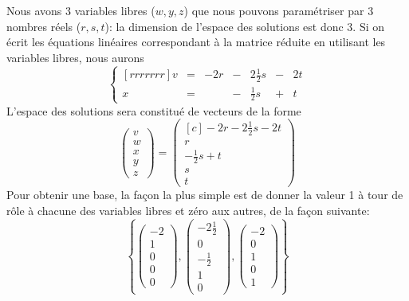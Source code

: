 \begin{exemple}
\[\]
Nous avons 3 variables libres ($w, y, z$) que nous pouvons paramétriser par 3 nombres
réels ($r,s,t$): la dimension de l'espace des solutions est donc 3.  Si on écrit
les équations linéaires correspondant à la matrice réduite en utilisant les variables
libres, nous aurons
\[
\left\{
\begin{matrix}[rrrrrrr]
v &=& -2r &-& 2\frac12 s &-& 2t \\
x &=& &-& \frac12 s &+& t
\end{matrix}
\right.
\]
L'espace des solutions sera constitué de vecteurs de la forme
\[
\begin{pmatrix}
v \\ w \\ x \\ y \\ z
\end{pmatrix}
=
\begin{pmatrix}[c]
-2r-2\frac12 s -2t \\ r \\ -\frac12s + t \\ s \\ t
\end{pmatrix}
\]
Pour obtenir une base, la façon la plus simple est de donner la valeur 1 à tour de rôle à chacune des variables 
libres et zéro aux autres, de la façon suivante:
\[
\left\{
\begin{pmatrix}
-2 \\ 1 \\ 0 \\ 0 \\ 0
\end{pmatrix},
\begin{pmatrix}
-2\frac12 \\ 0 \\ -\frac12 \\ 1 \\ 0
\end{pmatrix},
\begin{pmatrix}
-2 \\ 0 \\ 1 \\ 0 \\ 1
\end{pmatrix}
\right\}
\]
\end{exemple}



